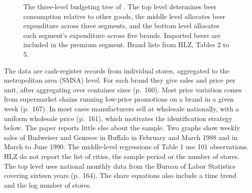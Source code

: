 \begin{figure}[htbp]
\centering
{}
\caption[The three-level budgeting tree of Hausman, Leonard and Zona]{The three-level budgeting tree of
\citet{HausmanLeonardZona1994}. The top level determines beer consumption relative to other goods, the middle
level allocates beer expenditure across three segments, and the bottom level allocates each segment's
expenditure across five brands. Imported beers are included in the premium segment. Brand lists from HLZ,
Tables 2 to 5.}
\label{fig:05-hlz-tree}
\end{figure}

The data are cash-register records from individual stores, aggregated to the metropolitan area (SMSA) level.
For each brand they give sales and price per unit, after aggregating over container sizes (p.~160). Most price
variation comes from supermarket chains running low-price promotions on a brand in a given week (p.~167).
In most cases manufacturers sell at wholesale nationally, with a uniform wholesale price (p.~161), which
motivates the
identification strategy below. The paper reports little else about the sample. Two graphs show weekly sales of
Budweiser and Genesee in Buffalo in February and March 1988 and in March to June 1990. The middle-level
regressions of Table 1 use 101 observations. HLZ do not report the list of cities, the sample period or the
number of stores. The top level uses national monthly data from the Bureau of Labor Statistics covering
sixteen years (p.~164). The share equations also include a time trend and the log number of stores.

